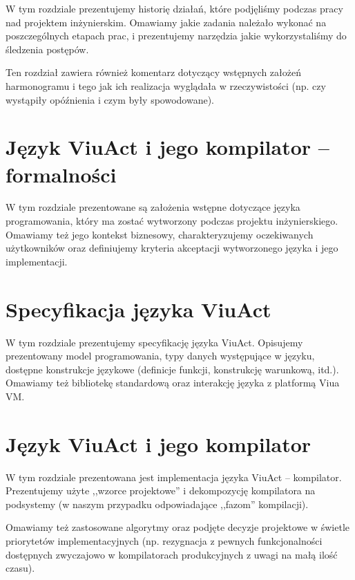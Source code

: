 \documentclass[11pt,oneside,a4paper,titlepage,onecolumn]{book}
\begin{document}
W tym rozdziale prezentujemy historię działań, które podjęliśmy podczas pracy nad projektem inżynierskim.
Omawiamy jakie zadania należało wykonać na poszczególnych etapach prac, i prezentujemy narzędzia jakie
wykorzystaliśmy do śledzenia postępów.

Ten rozdział zawiera również komentarz dotyczący wstępnych założeń harmonogramu i tego jak ich realizacja
wyglądała w rzeczywistości (np. czy wystąpiły opóźnienia i czym były spowodowane).


\section{Język ViuAct i jego kompilator -- formalności}

W tym rozdziale prezentowane są założenia wstępne dotyczące języka programowania, który ma zostać wytworzony
podczas projektu inżynierskiego. Omawiamy też jego kontekst biznesowy, charakteryzujemy oczekiwanych
użytkowników oraz definiujemy kryteria akceptacji wytworzonego języka i jego implementacji.

\section{Specyfikacja języka ViuAct}

W tym rozdziale prezentujemy specyfikację języka ViuAct. Opisujemy prezentowany model programowania, typy
danych występujące w języku, dostępne konstrukcje językowe (definicje funkcji, konstrukcję warunkową,
itd.). Omawiamy też bibliotekę standardową oraz interakcję języka z platformą Viua VM.

\section{Język ViuAct i jego kompilator}

W tym rozdziale prezentowana jest implementacja języka ViuAct -- kompilator. Prezentujemy użyte ,,wzorce
projektowe'' i dekompozycję kompilatora na podsystemy (w naszym przypadku odpowiadające ,,fazom'' kompilacji).

Omawiamy też zastosowane algorytmy oraz podjęte decyzje projektowe w świetle priorytetów implementacyjnych
(np. rezygnacja z pewnych funkcjonalności dostępnych zwyczajowo w kompilatorach produkcyjnych z uwagi na małą 
ilość czasu).
\end{document}
